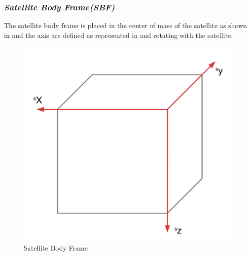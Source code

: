 \subsubsection{\textit{Satellite Body Frame(SBF)}}
The satellite body frame is placed in the center of mass of the satellite as shown in   and the axis are defined as represented in  and rotating with the satellite.
\begin{figure}[H]
\centering
\includegraphics[width=0.4\linewidth]{figures/frames}
\caption{Satellite Body Frame}
\label{fig:refframes}
\end{figure}
